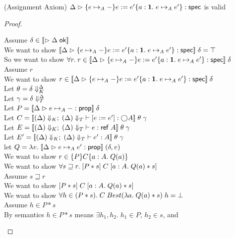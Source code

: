 \begin{lemma}{(Assignment Axiom)}
$\judgeS{\spec{e \pointsto_A -}{e := e'}{a:\unittype}{e \pointsto_A e'}}$ is valid  
\end{lemma}
\begin{proof}
  \begin{tabbedproof}
    \oo Assume $\delta \in \interp{\judgeACtx{\Delta}}$ \\
    \ooo We want to show $\interp{\judgeS{\spec{e \pointsto_A -}{e := e'}{a:\unittype}{e \pointsto_A e'}}}\;\delta = \top$ \\
    \ooo So we want to show $\forall r.\; r \in \interp{\judgeS{\spec{e \pointsto_A -}{e := e'}{a:\unittype}{e \pointsto_A e'}}}\;\delta$ \\
    \ooo Assume $r$ \\
    \oooo We want to show $r \in \interp{\judgeS{\spec{e \pointsto_A -}{e := e'}{a:\unittype}{e \pointsto_A e'}}}\;\delta$ \\
    \oooo Let $\theta = \restricttyenv{\Delta}{\delta}$ \\
    \oooo Let $\gamma = \restrictvals{\Delta}{\delta}$ \\
    \oooo Let $P = \interp{\judgeA{e \pointsto_A -}{\assert}}\;\delta$ \\
    \oooo Let $C = \interp{\judgeE[\restrictkind{\Delta}]{\restricttype{\Delta}}{\comp{e := e'}}{\monad{A}}}\;\theta\;\gamma$ \\
    \oooo Let $E = \interp{\judgeE[\restrictkind{\Delta}]{\restricttype{\Delta}}{e}{\reftype{A}}}\;\theta\;\gamma$ \\
    \oooo Let $E' = \interp{\judgeE[\restrictkind{\Delta}]{\restricttype{\Delta}}{e'}{A}}\;\theta\;\gamma$ \\
    \oooo let $Q = \semfun{v}{\interp{\judgeA{e \pointsto_A e'}{\assert}}\;(\delta, v)}$ \\
    \oooo We want to show $r \in \spec{P}{C}{a:A}{Q(a)}$ \\
    \oooo We want to show $\forall s \sqsupseteq r.\; \basicspec{P * s}{C}{a:A}{Q(a) * s}$ \\
    \oooo Assume $s \sqsupseteq r$ \\
    \ooooo We want to show $\basicspec{P * s}{C}{a:A}{Q(a) * s}$ \\
    \ooooo We want to show $\forall h \in (P * s).\; C\;Best(\semfun{a}{Q(a) * s})\;h = \bot$ \\
    \ooooo Assume $h \in P * s$ \\
    \oooooo By semantics $h \in P * s$ means $\exists h_1, h_2.\; h_1 \in P$, $h_2 \in s$, and

\end{tabbedproof}
\end{proof}
